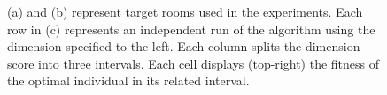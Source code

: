 \begin{figure}[h]
\centering
     \hfill
     \hfill

\caption{(a) and (b) represent target rooms used in the experiments. Each row in (c) represents an independent run of the algorithm using the dimension specified to the left. Each column splits the dimension score into three intervals. Each cell displays (top-right) the fitness of the optimal individual in its related interval.%
}
\end{figure}

